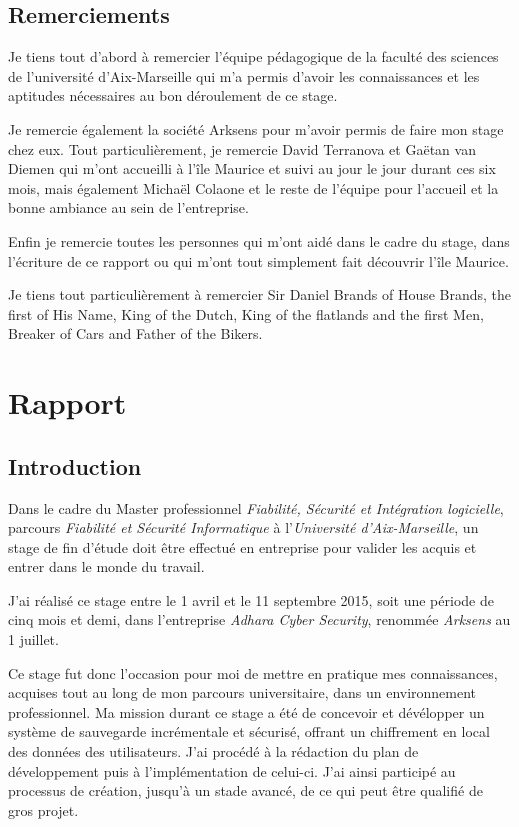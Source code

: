 \documentclass[a4paper,10pt, twoside]{report}
\newcommand\blankpage{
    \null
    \thispagestyle{empty}
    \addtocounter{page}{-1}
    \newpage}
\newcommand\blankpagenum{
    \null
    \thispagestyle{empty}
    \newpage}
\begin{document}
\begin{spacing}{1.2}
\begin{abstract}
\end{abstract}
\blankpage

\chapter*{Remerciements}
\thispagestyle{fancy}
Je tiens tout d'abord à remercier l'équipe pédagogique de la faculté des
sciences de l'université d'Aix-Marseille qui m'a permis d'avoir les
connaissances et les aptitudes nécessaires au bon déroulement de ce stage.

Je remercie également la société Arksens pour m'avoir permis de faire mon
stage chez eux. Tout particulièrement, je remercie David Terranova et Gaëtan
van Diemen qui m'ont accueilli à l'île Maurice et suivi au jour le jour
durant ces six mois, mais également Michaël Colaone et le reste de
l'équipe pour l'accueil et la bonne ambiance au sein de l'entreprise.

Enfin je remercie toutes les personnes qui m'ont aidé dans le cadre du stage,
dans l'écriture de ce rapport ou qui m'ont tout simplement fait découvrir
l'île Maurice.

Je tiens tout particulièrement à remercier Sir Daniel Brands of House Brands,
the first of His Name, King of the Dutch, King of the flatlands and the first
Men, Breaker of Cars and Father of the Bikers.

\clearpage
\pagestyle{fancy}
\tableofcontents
\clearpage
\blankpagenum

\part{Rapport}
\thispagestyle{empty}
\chapter{Introduction}
\thispagestyle{fancy}
Dans le cadre du Master professionnel \textit{Fiabilité, Sécurité et
Intégration logicielle}, parcours \textit{Fiabilité et Sécurité
Informatique} à l'\textit{Université d'Aix-Marseille}, un stage de fin
d'étude doit être effectué en entreprise pour valider les acquis et
entrer dans le monde du travail.

J'ai réalisé ce stage entre le 1 avril et le 11 septembre 2015, soit
une période de cinq mois et demi, dans l'entreprise \textit{Adhara Cyber
Security}, renommée \textit{Arksens} au 1 juillet.

Ce stage fut donc l'occasion pour moi de mettre en pratique mes connaissances,
acquises tout au long de mon parcours universitaire, dans un environnement
professionnel. Ma mission durant ce stage a été de concevoir et dévélopper un
système de sauvegarde incrémentale et sécurisé, offrant un chiffrement en local
des données des utilisateurs. J'ai procédé à la rédaction du plan de
développement puis à l'implémentation de celui-ci. J'ai ainsi participé au
processus de création, jusqu'à un stade avancé, de ce qui peut être qualifié
de gros projet.


\end{spacing}
\end{document}
